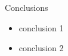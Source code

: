 \begin{frame}{Conclusions}

\begin{itemize}[leftmargin=0pt ]
\item conclusion 1
\item conclusion 2
\end{itemize}



\vfill

\footnotesize{
}

\end{frame}
